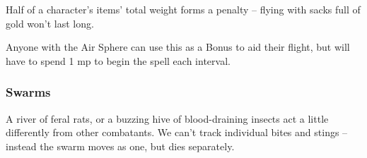 \begin{multicols}{2}
Half of a character's items' total \gls{weight} forms a penalty -- flying with sacks full of gold won't last long.

Anyone with the Air Sphere can use this as a Bonus to aid their flight, but will have to spend 1 \gls{mp} to begin the spell each \gls{interval}.

\subsubsection{Swarms}
\label{swarms}

A river of feral rats, or a buzzing hive of blood-draining insects act a little differently from other combatants.
We can't track individual bites and stings -- instead the swarm moves as one, but dies separately.





\end{multicols}
